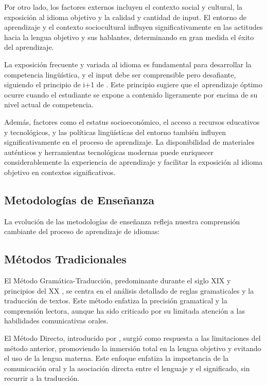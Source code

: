 Por otro lado, los factores externos incluyen el contexto social y cultural, la exposición al idioma objetivo y la calidad y cantidad de input. El entorno de aprendizaje y el contexto sociocultural influyen significativamente en las actitudes hacia la lengua objetivo y sus hablantes, determinando en gran medida el éxito del aprendizaje.

La exposición frecuente y variada al idioma es fundamental para desarrollar la competencia lingüística, y el input debe ser comprensible pero desafiante, siguiendo el principio de i+1 de \cite{krashen1982principles}. Este principio sugiere que el aprendizaje óptimo ocurre cuando el estudiante se expone a contenido ligeramente por encima de su nivel actual de competencia.

Además, factores como el estatus socioeconómico, el acceso a recursos educativos y tecnológicos, y las políticas lingüísticas del entorno también influyen significativamente en el proceso de aprendizaje. La disponibilidad de materiales auténticos y herramientas tecnológicas modernas puede enriquecer considerablemente la experiencia de aprendizaje y facilitar la exposición al idioma objetivo en contextos significativos.

\subsection{Metodologías de Enseñanza}
La evolución de las metodologías de enseñanza refleja nuestra comprensión cambiante del proceso de aprendizaje de idiomas:

\subsection{Métodos Tradicionales}

El Método Gramática-Traducción, predominante durante el siglo XIX y principios del XX \cite{richards2000approaches}, se centra en el análisis detallado de reglas gramaticales y la traducción de textos. Este método enfatiza la precisión gramatical y la comprensión lectora, aunque ha sido criticado por su limitada atención a las habilidades comunicativas orales.

El Método Directo, introducido por \cite{gouin1892art}, surgió como respuesta a las limitaciones del método anterior, promoviendo la inmersión total en la lengua objetivo y evitando el uso de la lengua materna. Este enfoque enfatiza la importancia de la comunicación oral y la asociación directa entre el lenguaje y el significado, sin recurrir a la traducción.

